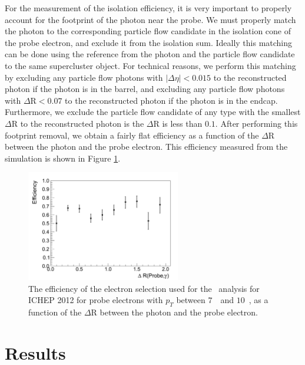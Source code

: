 \documentclass{cmspaper}
\begin{document}
For the measurement of the isolation efficiency, it is very important to properly account for the footprint
of the photon near the probe. We must properly match the photon to the corresponding particle flow candidate
in the isolation cone of the probe electron, and exclude it from the isolation sum. Ideally this matching
can be done using the reference from the photon and the particle flow candidate to the same supercluster
object. For technical reasons, we perform this matching by excluding any particle flow photons with 
$|\Delta\eta|<0.015$ to the reconstructed photon if the photon is in the barrel, and excluding any particle
flow photons with $\Delta$R$<0.07$ to the reconstructed photon if the photon is in the endcap. Furthermore,
we exclude the particle flow candidate of any type with the smallest $\Delta$R to the reconstructed
photon is the $\Delta$R is less than $0.1$. After performing this footprint removal, we obtain a fairly
flat efficiency as a function of the $\Delta$R between the photon and the probe electron. This efficiency 
measured from the simulation is shown in Figure \ref{fig:EfficiencyVsDeltaR}.

\begin{figure}[htb]
  \begin{center}
    \includegraphics[width=0.6\textwidth]{figures/Efficiency_DeltaRProbePhoton.pdf}
    \caption{The efficiency of the electron selection used for the \HiggsToZZ\ analysis for ICHEP 2012 for
      probe electrons with $p_{T}$ between $7$~\GeV\ and $10$~\GeV, as a function of the $\Delta$R between
      the photon and the probe electron.
    }
    \label{fig:EfficiencyVsDeltaR}
  \end{center}
\end{figure}


\section{Results}
\end{document}
